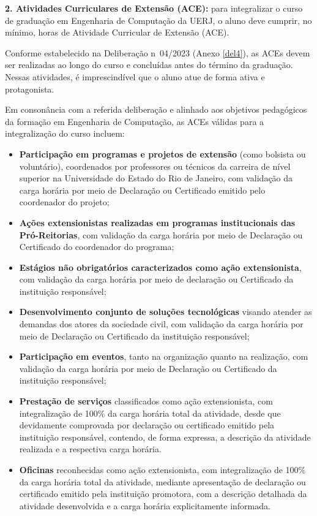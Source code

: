\textbf{2. Atividades Curriculares de Extensão (ACE):}
para integralizar o curso de graduação em Engenharia de Computação da UERJ, o aluno deve cumprir, no mínimo, \hACE horas de Atividade Curricular de Extensão (ACE).

Conforme estabelecido na Deliberação n\textordmasculine~04/2023 (Anexo \ref{del4}), as ACEs devem ser realizadas ao longo do curso e concluídas antes do término da graduação. Nessas atividades, é imprescindível que o aluno atue de forma ativa e protagonista.

Em consonância com a referida deliberação e alinhado aos objetivos pedagógicos da formação em Engenharia de Computação, as ACEs válidas para a integralização do curso incluem:


\begin{itemize}
    \item \textbf{Participação em programas e projetos de extensão} (como bolsista ou voluntário), coordenados por professores ou técnicos da carreira de nível superior na Universidade do Estado do Rio de Janeiro, com validação da carga horária por meio de Declaração ou Certificado emitido pelo coordenador do projeto;
    \item \textbf{Ações extensionistas realizadas em programas institucionais das Pró-Reitorias}, com validação da carga horária por meio de Declaração ou Certificado do coordenador do programa;
    \item \textbf{Estágios não obrigatórios caracterizados como ação extensionista}, com validação da carga horária por meio de declaração ou Certificado da instituição responsável;
    \item \textbf{Desenvolvimento conjunto de soluções tecnológicas} visando atender as demandas dos atores da sociedade civil, com validação da carga horária por meio de Declaração ou Certificado da instituição responsável;
    \item \textbf{Participação em eventos}, tanto na organização quanto na realização, com validação da carga horária por meio de Declaração ou Certificado da instituição responsável;
    \item \textbf{Prestação de serviços} classificados como ação extensionista, com integralização de 100\% da carga horária total da atividade, desde que devidamente comprovada por declaração ou certificado emitido pela instituição responsável, contendo, de forma expressa, a descrição da atividade realizada e a respectiva carga horária.
    \item \textbf{Oficinas} reconhecidas como ação extensionista, com integralização de 100\% da carga horária total da atividade, mediante apresentação de declaração ou certificado emitido pela instituição promotora, com a descrição detalhada da atividade desenvolvida e a carga horária explicitamente informada.

\end{itemize}
